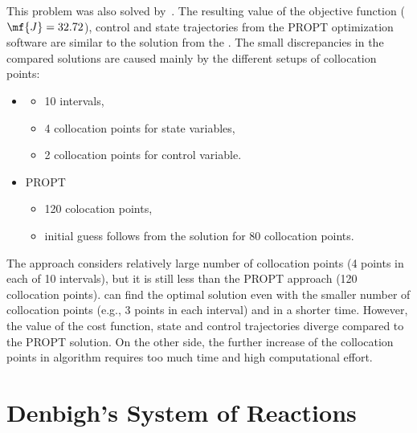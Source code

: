 This problem was also solved by~\citep{rut10}. The resulting value of the objective function ($\mf{J}=32.72$), control and state trajectories from the PROPT optimization software are similar to the solution from the . The small discrepancies in the compared solutions are caused mainly by the different setups of collocation points:
\begin{itemize}
	\item {} 
	\begin{itemize}
		\item 10 intervals,
		\item 4 collocation points for state variables,
		\item 2 collocation points for control variable.
	\end{itemize}
	\item PROPT
	\begin{itemize}
		\item 120 colocation points,
		\item initial guess follows from the solution for 80 collocation points.
	\end{itemize}
\end{itemize}
The  approach considers relatively large number of collocation points (4 points in each of 10 intervals), but it is still less than the PROPT approach (120 collocation points).  can find the optimal solution even with the smaller number of collocation points (e.g., 3 points in each interval) and in a shorter time. However, the value of the cost function, state and control trajectories diverge compared to the PROPT solution. On the other side, the further increase of the collocation points in  algorithm requires too much time and high computational effort.

\section{Denbigh's System of Reactions}
\label{sec:brpdae}

